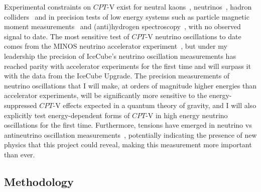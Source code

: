 \documentclass[a4paper,11pt]{article}
\begin{document}
Experimental constraints on $CPT$-V exist for neutral kaons~\cite{Ellis:1999xh, Ambrosino:2006ek, Abouzaid:2010ny, Babusci:2013gda, Schubert:2014ska}, neutrinos~\cite{Adamson:2013whj, Ohlsson:2014cha}, hadron colliders~\cite{Aad:2013eva, vanTilburg:2016awx} and in precision tests of low energy systems such as particle magnetic moment measurements~\cite{Bluhm:1997ci, Bennett:2007aa} and (anti)hydrogen spectroscopy~\cite{Kostelecky:2015nma}, with no observed signal to date. The most sensitive test of $CPT$-V neutrino oscillations to date comes from the MINOS neutrino accelerator experiment~\cite{Adamson:2013whj}, but under my leadership the precision of IceCube's neutrino oscillation measurements has reached parity with accelerator experiments for the first time and will surpass it with the data from the IceCube Upgrade. The precision measurements of neutrino oscillations that I will make, at orders of magnitude higher energies than accelerator experiments, will be significantly more sensitive to the energy-suppressed $CPT$-V effects expected in a quantum theory of gravity, and I will also explicitly test energy-dependent forms of $CPT$-V in high energy neutrino oscillations for the first time. Furthermore, tensions have emerged in neutrino vs antineutrino oscillation measurements~\cite{Abe:2019vii,NOvA_CP_result}, potentially indicating the presence of new physics that this project could reveal, making this measurement more important than ever. \\



\subsection{Methodology}
\vspace{0.1 cm}

\end{document}

